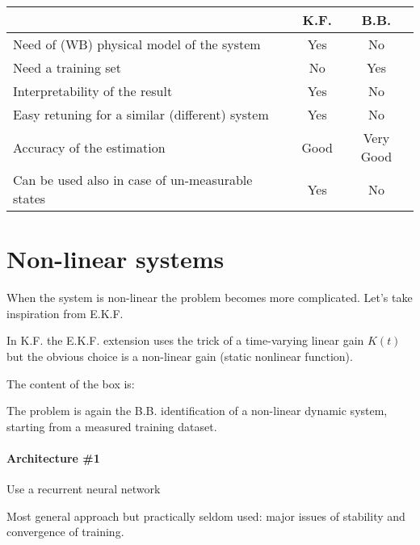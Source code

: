 \begin{center}
    \begin{tabular}{l|c|c}
        & \textbf{K.F.} & \textbf{B.B.} \\
        \hline
        Need of (WB) physical model of the system & \color{red} Yes & \color{green} No \\
        Need a training set & \color{green} No & \color{red} Yes \\
        Interpretability of the result & \color{green} Yes & \color{red} No \\
        Easy retuning for a similar (different) system & \color{green} Yes & \color{red} No \\
        Accuracy of the estimation & \color{green} Good & \color{green} Very Good \\
        Can be used also in case of un-measurable states & \color{green} Yes & \color{red} No \\
    \end{tabular}
\end{center}

\section{Non-linear systems}

When the system is non-linear the problem becomes more complicated.
Let's take inspiration from E.K.F.


\begin{remark}
    In K.F. the E.K.F. extension uses the trick of a time-varying linear gain $K(t)$ but the obvious choice is a non-linear gain (static nonlinear function).
\end{remark}

The content of the box is:

The problem is again the B.B. identification of a non-linear dynamic system, starting from a measured training dataset.

\paragraph{Architecture \#1} Use a recurrent neural network



Most general approach but practically seldom used: major issues of stability and convergence of training.

